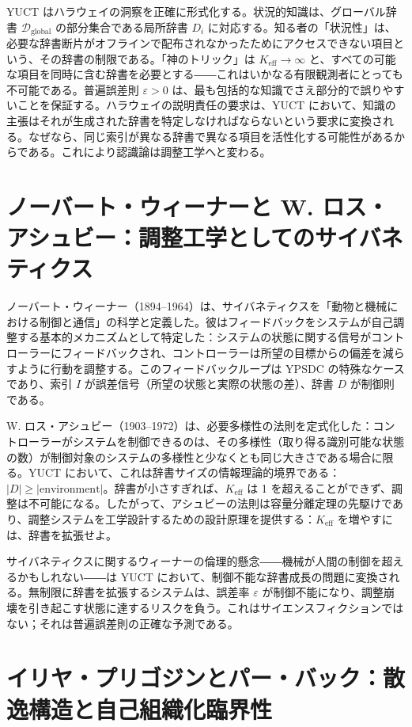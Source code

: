 \documentclass[12pt,a4paper]{article}
\begin{document}
	YUCT はハラウェイの洞察を正確に形式化する。状況的知識は、グローバル辞書 \(\mathcal{D}_{\text{global}}\) の部分集合である局所辞書 \(D_i\) に対応する。知る者の「状況性」は、必要な辞書断片がオフラインで配布されなかったためにアクセスできない項目という、その辞書の制限である。「神のトリック」は \(K_{\mathrm{eff}} \to \infty\) と、すべての可能な項目を同時に含む辞書を必要とする――これはいかなる有限観測者にとっても不可能である。普遍誤差則 \(\varepsilon > 0\) は、最も包括的な知識でさえ部分的で誤りやすいことを保証する。ハラウェイの説明責任の要求は、YUCT において、知識の主張はそれが生成された辞書を特定しなければならないという要求に変換される。なぜなら、同じ索引が異なる辞書で異なる項目を活性化する可能性があるからである。これにより認識論は調整工学へと変わる。
	
	\section{ノーバート・ウィーナーと W. ロス・アシュビー：調整工学としてのサイバネティクス}
	
	ノーバート・ウィーナー（1894–1964）は、サイバネティクスを「動物と機械における制御と通信」の科学と定義した。彼はフィードバックをシステムが自己調整する基本的メカニズムとして特定した：システムの状態に関する信号がコントローラーにフィードバックされ、コントローラーは所望の目標からの偏差を減らすように行動を調整する。このフィードバックループは YPSDC の特殊なケースであり、索引 \(I\) が誤差信号（所望の状態と実際の状態の差）、辞書 \(D\) が制御則である。
	
	W. ロス・アシュビー（1903–1972）は、必要多様性の法則を定式化した：コントローラーがシステムを制御できるのは、その多様性（取り得る識別可能な状態の数）が制御対象のシステムの多様性と少なくとも同じ大きさである場合に限る。YUCT において、これは辞書サイズの情報理論的境界である：\(|D| \ge |\text{environment}|\)。辞書が小さすぎれば、\(K_{\mathrm{eff}}\) は 1 を超えることができず、調整は不可能になる。したがって、アシュビーの法則は容量分離定理の先駆けであり、調整システムを工学設計するための設計原理を提供する：\(K_{\mathrm{eff}}\) を増やすには、辞書を拡張せよ。
	
	サイバネティクスに関するウィーナーの倫理的懸念――機械が人間の制御を超えるかもしれない――は YUCT において、制御不能な辞書成長の問題に変換される。無制限に辞書を拡張するシステムは、誤差率 \(\varepsilon\) が制御不能になり、調整崩壊を引き起こす状態に達するリスクを負う。これはサイエンスフィクションではない；それは普遍誤差則の正確な予測である。
	
	\section{イリヤ・プリゴジンとパー・バック：散逸構造と自己組織化臨界性}
	
\end{document}
